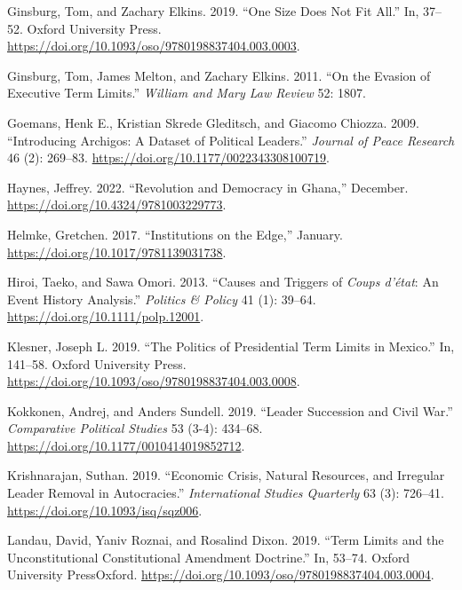 \documentclass[
  12pt,
]{report}
\newlength{\cslhangindent}
\newenvironment{CSLReferences}[2] %
 {\begin{list}{}{%
  \setlength{\itemindent}{0pt}
  \setlength{\leftmargin}{0pt}
  \setlength{\parsep}{0pt}
  \ifodd #1
   \setlength{\leftmargin}{\cslhangindent}
   \setlength{\itemindent}{-1\cslhangindent}
  \fi
  \setlength{\itemsep}{#2\baselineskip}}}
 {\end{list}}
\begin{document}
\begin{CSLReferences}{1}{0}
Ginsburg, Tom, and Zachary Elkins. 2019. {``One Size Does Not Fit
All.''} In, 37--52. Oxford University Press.
\url{https://doi.org/10.1093/oso/9780198837404.003.0003}.

Ginsburg, Tom, James Melton, and Zachary Elkins. 2011. {``On the Evasion
of Executive Term Limits.''} \emph{William and Mary Law Review} 52:
1807.

Goemans, Henk E., Kristian Skrede Gleditsch, and Giacomo Chiozza. 2009.
{``Introducing Archigos: A Dataset of Political Leaders.''}
\emph{Journal of Peace Research} 46 (2): 269--83.
\url{https://doi.org/10.1177/0022343308100719}.

Haynes, Jeffrey. 2022. {``Revolution and Democracy in Ghana,''}
December. \url{https://doi.org/10.4324/9781003229773}.

Helmke, Gretchen. 2017. {``Institutions on the Edge,''} January.
\url{https://doi.org/10.1017/9781139031738}.

Hiroi, Taeko, and Sawa Omori. 2013. {``Causes and Triggers of
{\emph{Coups d'état}}: An Event History Analysis.''} \emph{Politics \&
Policy} 41 (1): 39--64. \url{https://doi.org/10.1111/polp.12001}.

Klesner, Joseph L. 2019. {``The Politics of Presidential Term Limits in
Mexico.''} In, 141--58. Oxford University Press.
\url{https://doi.org/10.1093/oso/9780198837404.003.0008}.

Kokkonen, Andrej, and Anders Sundell. 2019. {``Leader Succession and
Civil War.''} \emph{Comparative Political Studies} 53 (3-4): 434--68.
\url{https://doi.org/10.1177/0010414019852712}.

Krishnarajan, Suthan. 2019. {``Economic Crisis, Natural Resources, and
Irregular Leader Removal in Autocracies.''} \emph{International Studies
Quarterly} 63 (3): 726--41. \url{https://doi.org/10.1093/isq/sqz006}.

Landau, David, Yaniv Roznai, and Rosalind Dixon. 2019. {``Term Limits
and the Unconstitutional Constitutional Amendment Doctrine.''} In,
53--74. Oxford University PressOxford.
\url{https://doi.org/10.1093/oso/9780198837404.003.0004}.


\end{CSLReferences}
\end{document}
